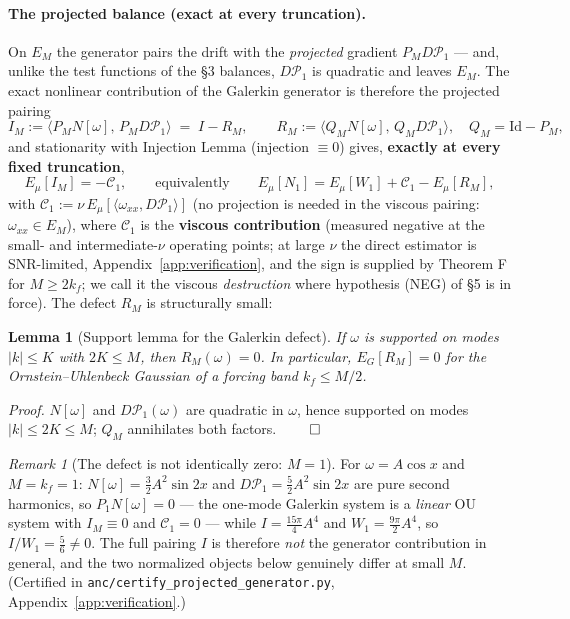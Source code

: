 \documentclass[11pt]{article}
\newtheorem{lemma}[theorem]{Lemma}
\theoremstyle{remark}
\newtheorem{remark}[theorem]{Remark}
\theoremstyle{plain}
\newcommand{\eqdef}{:=}
\begin{document}
\paragraph{The projected balance (exact at every truncation).} On $E_M$ the generator
pairs the drift with the \emph{projected} gradient $P_M D\mathcal{P}_1$ --- and, unlike
the test functions of the \S3 balances, $D\mathcal{P}_1$ is quadratic and leaves $E_M$.
The exact nonlinear contribution of the Galerkin generator is therefore the projected
pairing
\begin{equation}
   I_M \eqdef \bigl\langle P_M N[\omega],\, P_M D\mathcal{P}_1\bigr\rangle
   \;=\; I - R_M, \qquad
   R_M \eqdef \bigl\langle Q_M N[\omega],\, Q_M D\mathcal{P}_1\bigr\rangle,\quad Q_M = \mathrm{Id} - P_M,
\end{equation}
and stationarity with Injection Lemma (injection $\equiv 0$) gives, \textbf{exactly at every
fixed truncation},
\begin{equation}\label{eq:pbexact}
   E_\mu[I_M] = -\mathcal{C}_1,
   \qquad\text{equivalently}\qquad
   E_\mu[N_1] = E_\mu[W_1] + \mathcal{C}_1 - E_\mu[R_M],
\end{equation}
with $\mathcal{C}_1 \eqdef \nu\, E_\mu[\langle \omega_{xx}, D\mathcal{P}_1\rangle]$
(no projection is needed in the viscous pairing: $\omega_{xx} \in E_M$), where
$\mathcal{C}_1$ is the \textbf{viscous contribution} (measured negative at the small-
and intermediate-$\nu$ operating points; at large $\nu$ the direct estimator is
SNR-limited, Appendix~\ref{app:verification}, and the sign is supplied by Theorem F for $M \ge 2k_f$; we
call it the viscous \emph{destruction} where hypothesis (NEG) of \S5 is in force).
The defect $R_M$ is structurally small:

\begin{lemma}[Support lemma for the Galerkin defect]\label{lem:rm}
If $\omega$ is supported on modes $|k| \le K$ with $2K \le M$, then $R_M(\omega) = 0$.
In particular, $E_G[R_M] = 0$ for the Ornstein--Uhlenbeck Gaussian of a forcing band
$k_f \le M/2$.
\end{lemma}

\emph{Proof.} $N[\omega]$ and $D\mathcal{P}_1(\omega)$ are quadratic in $\omega$, hence
supported on modes $|k| \le 2K \le M$; $Q_M$ annihilates both factors. $\qed$

\begin{remark}[The defect is not identically zero: $M=1$]\label{rem:m1}
For $\omega = A\cos x$ and $M = k_f = 1$: $N[\omega] = \tfrac32 A^2\sin 2x$ and
$D\mathcal{P}_1 = \tfrac52 A^2\sin 2x$ are pure second harmonics, so $P_1 N[\omega] = 0$
--- the one-mode Galerkin system is a \emph{linear} OU system with $I_M \equiv 0$ and
$\mathcal{C}_1 = 0$ --- while $I = \tfrac{15\pi}{4}A^4$ and $W_1 = \tfrac{9\pi}{2}A^4$,
so $I/W_1 = \tfrac56 \ne 0$. The full pairing $I$ is therefore \emph{not} the generator
contribution in general, and the two normalized objects below genuinely differ at small
$M$. (Certified in \texttt{anc/certify\_projected\_generator.py}, Appendix~\ref{app:verification}.)
\end{remark}
\end{document}
